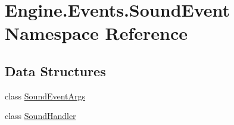 \hypertarget{a00250}{}\section{Engine.\+Events.\+Sound\+Event Namespace Reference}
\label{a00250}
\subsection*{Data Structures}
\begin{DoxyCompactItemize}
\item 
class \hyperlink{a00390}{Sound\+Event\+Args}
\item 
class \hyperlink{a00394}{Sound\+Handler}
\end{DoxyCompactItemize}
